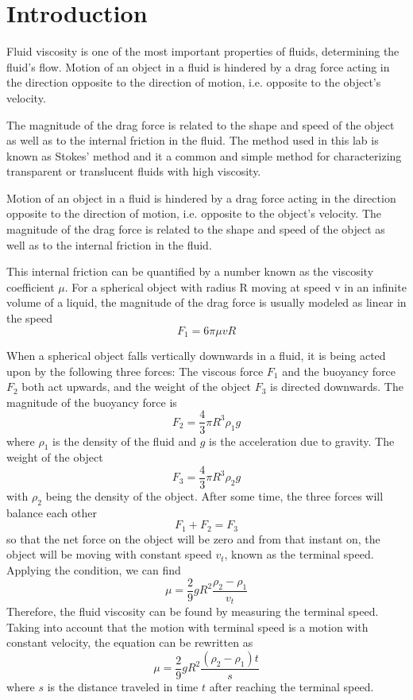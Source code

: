 \section{Introduction}
Fluid viscosity is one of the most important properties of fluids, determining
the fluid’s flow. 
Motion of an object in a fluid is hindered by a drag force acting in the
direction opposite to the direction of motion, i.e. opposite to the object’s
velocity. 

The magnitude of the drag force is related to the shape and speed of the object
as well as to the internal friction in the fluid.
The method used in this lab is known as Stokes’ method and it a common and
simple method for characterizing transparent or translucent fluids with high
viscosity.


Motion of an object in a fluid is hindered by a drag force acting in the
direction opposite to the direction of motion, i.e. opposite to the object’s
velocity. 
The magnitude of the drag force is related to the shape and speed of the object
as well as to the internal friction in the fluid.

This internal friction can be quantified by a number known as the viscosity
coefficient $\mu$.
For a spherical object with radius R moving at speed v in an infinite volume of
a liquid, the magnitude of the drag force is usually modeled as linear in the
speed
$$  F_1 = 6 \pi \mu v R  $$

When a spherical object falls vertically downwards in a fluid, it is being acted
upon by the following three forces:
The viscous force \emph{$F_1$} and the buoyancy force \emph{$F_2$} both act
upwards, and the weight of the object \emph{$F_3$} is directed downwards.
The magnitude of the buoyancy force is
$$  F_2 = \frac{4}{3} \pi R^3 \rho_1 g $$
where $\rho_1$ is the density of the fluid and $g$ is the acceleration due to
gravity. The weight of the object
$$  F_3 = \frac{4}{3} \pi R^3 \rho_2 g $$
with $\rho_2$ being the density of the object. After some time, the three forces
will balance each other
$$  F_1 + F_2 = F_3  $$
so that the net force on the object will be zero and from that instant on, the
object will be moving with constant speed $v_t$, known as the terminal speed.
Applying the condition, we can find
$$  \mu = \frac{2}{9} g R^2 \frac{\rho_2 - \rho_1 }{v_t}  $$
Therefore, the fluid viscosity can be found by measuring the terminal speed.
Taking into account that the motion with terminal speed is a motion with
constant velocity, the equation can be rewritten as
$$  \mu = \frac{2}{9} g R^2 \frac{( \rho_2 - \rho_1 ) t  }{s}  $$
where $s$ is the distance traveled in time $t$ after reaching the terminal
speed.

